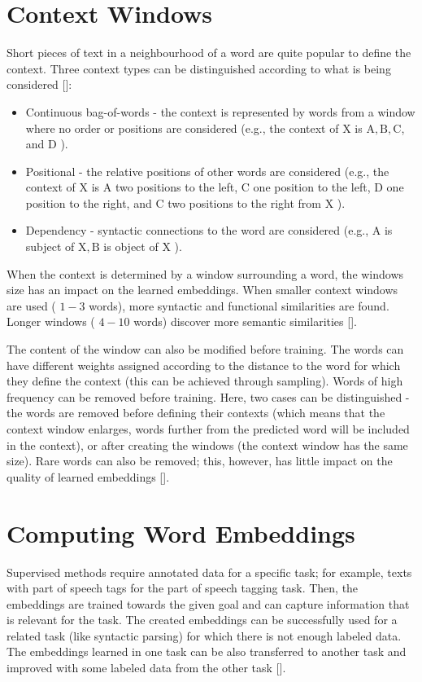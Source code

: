 \section{Context Windows}
Short pieces of text in a neighbourhood of a word are quite popular to define the context. Three context types can be distinguished according to what is being considered [\cite{ref101}]:

\begin{itemize}
  \item Continuous bag-of-words - the context is represented by words from a window where no order or positions are considered (e.g., the context of X is $\mathrm{A}, \mathrm{B}, \mathrm{C}$, and D ).
  \item Positional - the relative positions of other words are considered (e.g., the context of X is A two positions to the left, C one position to the left, D one position to the right, and C two positions to the right from X ).
  \item Dependency - syntactic connections to the word are considered (e.g., A is subject of $\mathrm{X}, \mathrm{B}$ is object of X ).
\end{itemize}

When the context is determined by a window surrounding a word, the windows size has an impact on the learned embeddings. When smaller context windows are used ( $1-3$ words), more syntactic and functional similarities are found. Longer windows ( $4-10$ words) discover more semantic similarities [\cite{ref138}].

The content of the window can also be modified before training. The words can have different weights assigned according to the distance to the word for which they define the context (this can be achieved through sampling). Words of high frequency can be removed before training. Here, two cases can be distinguished - the words are removed before defining their contexts (which means that the context window enlarges, words further from the predicted word will be included in the context), or after creating the windows (the context window has the same size). Rare words can also be removed; this, however, has little impact on the quality of learned embeddings [\cite{ref166}].

\section{Computing Word Embeddings}
Supervised methods require annotated data for a specific task; for example, texts with part of speech tags for the part of speech tagging task. Then, the embeddings are trained towards the given goal and can capture information that is relevant for the task. The created embeddings can be successfully used for a related task (like syntactic parsing) for which there is not enough labeled data. The embeddings learned in one task can be also transferred to another task and improved with some labeled data from the other task [\cite{ref101}].

